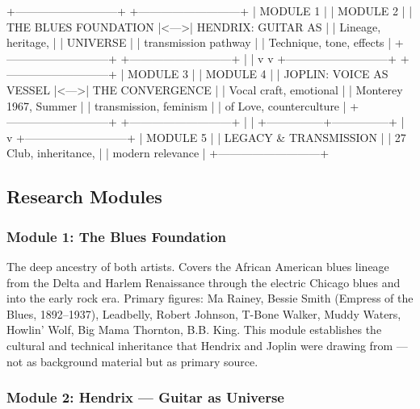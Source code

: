 \documentclass[11pt,letterpaper]{article}
\begin{document}
\begin{asciibox}
+---------------------------+     +---------------------------+
|  MODULE 1                 |     |  MODULE 2                 |
|  THE BLUES FOUNDATION     |<--->|  HENDRIX: GUITAR AS       |
|  Lineage, heritage,       |     |  UNIVERSE                 |
|  transmission pathway     |     |  Technique, tone, effects |
+---------------------------+     +---------------------------+
             |                               |
             v                               v
+---------------------------+     +---------------------------+
|  MODULE 3                 |     |  MODULE 4                 |
|  JOPLIN: VOICE AS VESSEL  |<--->|  THE CONVERGENCE          |
|  Vocal craft, emotional   |     |  Monterey 1967, Summer    |
|  transmission, feminism   |     |  of Love, counterculture  |
+---------------------------+     +---------------------------+
             |                               |
             +---------------+---------------+
                             |
                             v
             +---------------------------+
             |  MODULE 5                 |
             |  LEGACY & TRANSMISSION    |
             |  27 Club, inheritance,    |
             |  modern relevance         |
             +---------------------------+
\end{asciibox}

\subsection{Research Modules}

\subsubsection{Module 1: The Blues Foundation}

The deep ancestry of both artists. Covers the African American blues lineage from the Delta and Harlem Renaissance through the electric Chicago blues and into the early rock era. Primary figures: Ma Rainey, Bessie Smith (Empress of the Blues, 1892--1937), Leadbelly, Robert Johnson, T-Bone Walker, Muddy Waters, Howlin' Wolf, Big Mama Thornton, B.B. King. This module establishes the cultural and technical inheritance that Hendrix and Joplin were drawing from --- not as background material but as primary source.

\subsubsection{Module 2: Hendrix --- Guitar as Universe}
\end{document}
